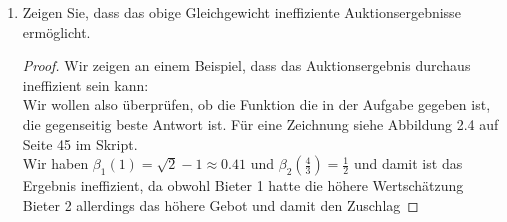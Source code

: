 \documentclass[12pt]{extreport} %
\theoremstyle{named}
\theoremstyle{nnamed}
\theoremstyle{itshape}
\theoremstyle{normal}
\begin{document}
\begin{enumerate}
\begin{proof}
		  	\textbf{Bieter 1}:
		\end{proof}
	\item Zeigen Sie, dass das obige Gleichgewicht ineffiziente Auktionsergebnisse ermöglicht.
		\begin{proof}
			Wir zeigen an einem Beispiel, dass das Auktionsergebnis durchaus ineffizient sein kann: \\
			
			Wir wollen also überprüfen, ob die Funktion die in der Aufgabe gegeben ist, die gegenseitig beste Antwort ist. Für eine Zeichnung siehe Abbildung 2.4 auf Seite 45 im Skript. \\

			  Wir haben $\beta_{1}(1) = \sqrt{2} - 1 \approx 0.41$ und $\beta_{2}(\frac{4}{3}) = \frac{1}{2}$ und damit ist das Ergebnis ineffizient, da obwohl Bieter 1 hatte die höhere Wertschätzung Bieter 2 allerdings das höhere Gebot und damit den Zuschlag
		\end{proof}
\end{enumerate}
\end{document}
